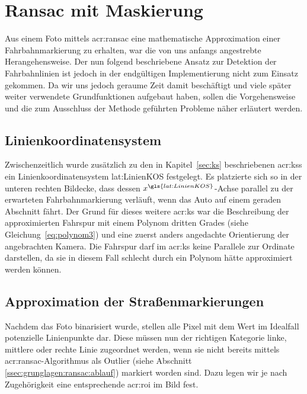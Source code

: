 \section{Ransac mit Maskierung \dcfirstauthorshort} 
\label{sec:maskenbau}
\label{sec:polynombasierte_fahrspurerkennung:ransac}

Aus einem Foto mittels \gls{acr:ransac} eine mathematische Approximation einer Fahrbahnmarkierung zu erhalten, war die von uns anfangs angestrebte Herangehensweise. Der nun folgend beschriebene Ansatz zur Detektion der Fahrbahnlinien ist jedoch in der endgültigen Implementierung nicht zum Einsatz gekommen. Da wir uns jedoch geraume Zeit damit beschäftigt und viele später weiter verwendete Grundfunktionen aufgebaut haben, sollen die Vorgehensweise und die zum Ausschluss der Methode geführten Probleme näher erläutert werden. 

\subsection{Linienkoordinatensystem}
Zwischenzeitlich wurde zusätzlich zu den in Kapitel~\ref{sec:ks} beschriebenen \glspl{acr:ks} ein Linienkoordinatensystem \gls{lat:LinienKOS} festgelegt. Es platzierte sich so in der unteren rechten Bildecke, dass dessen \( x^{\gls{lat:LinienKOS}} \)-Achse parallel zu der erwarteten Fahrbahnmarkierung verläuft, wenn das Auto auf einem geraden Abschnitt fährt. Der Grund für dieses weitere \gls{acr:ks} war die Beschreibung der approximierten Fahrspur mit einem Polynom dritten Grades (siehe Gleichung~\ref{eq:polynom3}) und eine zuerst anders angedachte Orientierung der angebrachten Kamera. Die Fahrspur darf im \gls{acr:ks} keine Parallele zur Ordinate darstellen, da sie in diesem Fall schlecht durch ein Polynom hätte approximiert werden können. 

\subsection{Approximation der Straßenmarkierungen}

Nachdem das Foto binarisiert wurde, stellen alle Pixel mit dem Wert \grqq{} im Idealfall potenzielle Linienpunkte dar. Diese müssen nun der richtigen Kategorie \glqq linke\grqq , \glqq mittlere\grqq{} oder \glqq rechte\grqq{} Linie zugeordnet werden, wenn sie nicht bereits mittels \gls{acr:ransac}-Algorithmus als Outlier (siehe Abschnitt \ref{ssec:grunglagen:ransac:ablauf}) markiert worden sind. Dazu legen wir je nach Zugehörigkeit eine entsprechende \gls{acr:roi} im Bild fest.

